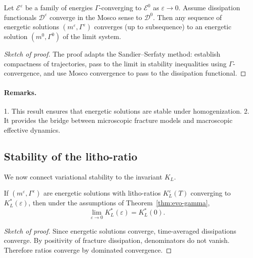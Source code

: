 \begin{theorem}\label{thm:evo-gamma}
Let $\mathcal{E}^\varepsilon$ be a family of energies $\Gamma$-converging to $\mathcal{E}^0$ as $\varepsilon\to 0$. 
Assume dissipation functionals $\mathcal{D}^\varepsilon$ converge in the Mosco sense to $\mathcal{D}^0$. 
Then any sequence of energetic solutions $(m^\varepsilon,\Gamma^\varepsilon)$ converges (up to subsequence) 
to an energetic solution $(m^0,\Gamma^0)$ of the limit system.
\end{theorem}

\begin{proof}[Sketch of proof]
The proof adapts the Sandier--Serfaty method: establish compactness of trajectories, pass to the limit in stability inequalities using $\Gamma$-convergence, and use Mosco convergence to pass to the dissipation functional.
\end{proof}

\paragraph{Remarks.}
1. This result ensures that energetic solutions are stable under homogenization.  
2. It provides the bridge between microscopic fracture models and macroscopic effective dynamics.

\subsection{Stability of the litho-ratio}
We now connect variational stability to the invariant $K_L$.

\begin{theorem}\label{thm:KL-stability}
If $(m^\varepsilon,\Gamma^\varepsilon)$ are energetic solutions with litho-ratios $K_L^\varepsilon(T)$ converging to $K_L^*(\varepsilon)$, 
then under the assumptions of Theorem~\ref{thm:evo-gamma},
\[
  \lim_{\varepsilon\to 0} K_L^*(\varepsilon) = K_L^*(0).
\]
\end{theorem}

\begin{proof}[Sketch of proof]
Since energetic solutions converge, time-averaged dissipations converge. 
By positivity of fracture dissipation, denominators do not vanish. 
Therefore ratios converge by dominated convergence.
\end{proof}

